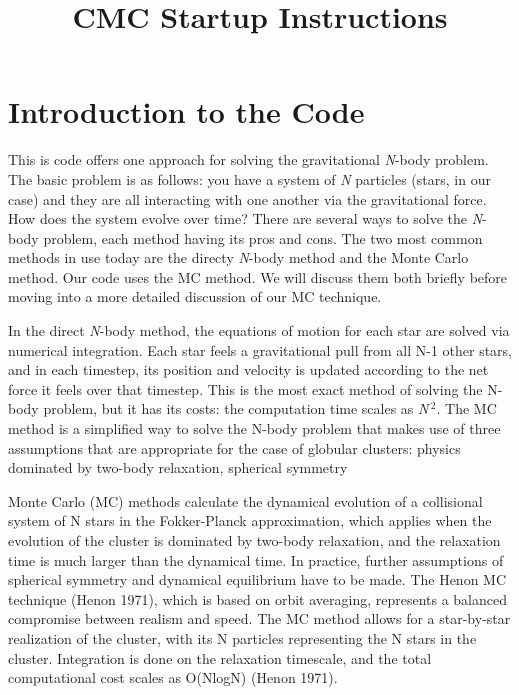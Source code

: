 \documentclass[11pt]{article}
\title{CMC Startup Instructions}
\begin{document}
\maketitle


\tableofcontents
\newpage



\section{Introduction to the Code}
This is code offers one approach for solving the gravitational {\it N}-body problem. The basic problem is as follows: you have a system of {\it N} particles (stars, in our case) and they are all interacting with one another via the gravitational force. How does the system evolve over time? There are several ways to solve the {\it N}-body problem, each method having its pros and cons. The two most common methods in use today are the directy {\it N}-body method and the Monte Carlo method. Our code uses the MC method. We will discuss them both briefly before moving into a more detailed discussion of our MC technique.

In the direct {\it N}-body method, the equations of motion for each star are solved via numerical integration. Each star feels a gravitational pull from all N-1 other stars, and in each timestep, its position and velocity is updated according to the net force it feels over that timestep. This is the most exact method of solving the N-body problem, but it has its costs: the computation time scales as {\it N\,}$^2$. The MC method is a simplified way to solve the N-body problem that makes use of three assumptions that are appropriate for the case of globular clusters: physics dominated by two-body relaxation, spherical symmetry

Monte Carlo (MC) methods calculate the dynamical evolution of a collisional system of N stars in the Fokker-Planck approximation, which applies when the evolution of the cluster is dominated by two-body relaxation, and the relaxation time is much larger than the dynamical time. In practice, further assumptions of spherical symmetry and dynamical equilibrium have to be made. The Henon MC technique (Henon 1971), which is based on orbit averaging, represents a balanced compromise between realism and speed. The MC method allows for a star-by-star realization of the cluster, with its N particles representing the N stars in the cluster. Integration is done on the relaxation timescale, and the total computational cost scales as O(NlogN) (Henon 1971).
\end{document}
